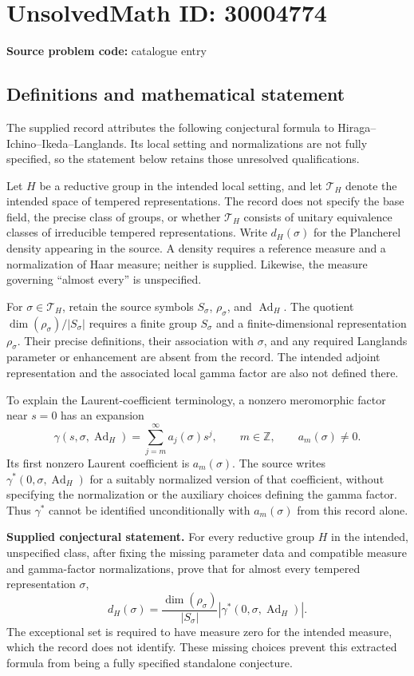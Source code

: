 \documentclass[11pt]{article}
\newcommand{\Z}{\mathbb{Z}}
\begin{document}
\section*{UnsolvedMath ID: 30004774}
\textbf{Source problem code:} catalogue entry
\subsection{Definitions and mathematical statement}
The supplied record attributes the following conjectural formula to Hiraga--Ichino--Ikeda--Langlands. Its local setting and normalizations are not fully specified, so the statement below retains those unresolved qualifications.

Let \(H\) be a reductive group in the intended local setting, and let \(\mathcal T_H\) denote the intended space of tempered representations. The record does not specify the base field, the precise class of groups, or whether \(\mathcal T_H\) consists of unitary equivalence classes of irreducible tempered representations. Write \(d_H(\sigma)\) for the Plancherel density appearing in the source. A density requires a reference measure and a normalization of Haar measure; neither is supplied. Likewise, the measure governing ``almost every'' is unspecified.

For \(\sigma\in\mathcal T_H\), retain the source symbols \(S_\sigma\), \(\rho_\sigma\), and \(\operatorname{Ad}_H\). The quotient \(\dim(\rho_\sigma)/|S_\sigma|\) requires a finite group \(S_\sigma\) and a finite-dimensional representation \(\rho_\sigma\). Their precise definitions, their association with \(\sigma\), and any required Langlands parameter or enhancement are absent from the record. The intended adjoint representation and the associated local gamma factor are also not defined there.

To explain the Laurent-coefficient terminology, a nonzero meromorphic factor near \(s=0\) has an expansion
\[
\gamma(s,\sigma,\operatorname{Ad}_H)
 =\sum_{j=m}^{\infty}a_j(\sigma)s^j,
\qquad m\in\Z,\qquad a_m(\sigma)\ne0.
\]
Its first nonzero Laurent coefficient is \(a_m(\sigma)\). The source writes \(\gamma^*(0,\sigma,\operatorname{Ad}_H)\) for a suitably normalized version of that coefficient, without specifying the normalization or the auxiliary choices defining the gamma factor. Thus \(\gamma^*\) cannot be identified unconditionally with \(a_m(\sigma)\) from this record alone.

\textbf{Supplied conjectural statement.} For every reductive group \(H\) in the intended, unspecified class, after fixing the missing parameter data and compatible measure and gamma-factor normalizations, prove that for almost every tempered representation \(\sigma\),
\[
 d_H(\sigma)
 =\frac{\dim(\rho_\sigma)}{|S_\sigma|}
   \left|\gamma^*(0,\sigma,\operatorname{Ad}_H)\right|.
\]
The exceptional set is required to have measure zero for the intended measure, which the record does not identify. These missing choices prevent this extracted formula from being a fully specified standalone conjecture.
\end{document}
